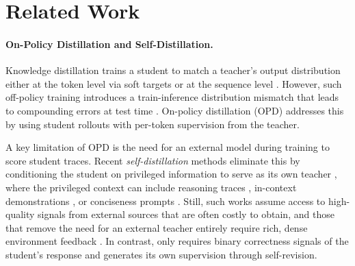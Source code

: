 \section{Related Work}\label{sec:related}
\paragraph{On-Policy Distillation and Self-Distillation.}
Knowledge distillation trains a student to match a teacher's output distribution either at the token level via soft targets \citep{hinton2015distilling} or at the sequence level \citep{kim2016sequence}. 
However, such off-policy training introduces a train-inference distribution mismatch that leads to compounding errors at test time \citep{bengio2015scheduled, chen2025retaining}.
On-policy distillation (OPD) \citep{agarwal2024onpolicy, gu2024minillm, boizard2024uld, minixhofer2025cross} addresses this by using student rollouts with per-token supervision from the teacher.

A key limitation of OPD is the need for an external model during training to score student traces. 
Recent \emph{self-distillation} methods \citep{furlanello2018born, zhang2019teacher} eliminate this by conditioning the student on privileged information to serve as its own teacher \citep{askell2021general, snell2022learning}, where the privileged 
context can include reasoning traces \citep{zhao2026self}, in-context demonstrations \citep{shenfeld2026selfdistillationenablescontinuallearning}, or conciseness prompts \citep{sang2026onpolicy}.
Still, such works assume access to high-quality signals from external sources that are often costly to obtain, and those that remove the need for an external teacher entirely require rich, dense environment feedback \citep{hubotter2026reinforcement}.
In contrast, \ours{} only requires binary correctness signals of the student's response and generates its own supervision through self-revision.

